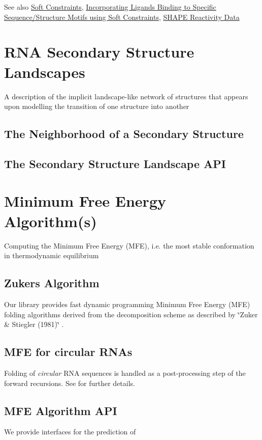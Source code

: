 \begin{DoxySeeAlso}{See also}
\hyperlink{group__soft__constraints}{Soft Constraints}, \hyperlink{group__constraints__ligand}{Incorporating Ligands Binding to Specific Sequence/\+Structure Motifs using Soft Constraints}, \hyperlink{group__SHAPE__reactivities}{S\+H\+A\+PE Reactivity Data}
\end{DoxySeeAlso}
 \hypertarget{secondary_structure_landscape}{}\section{R\+NA Secondary Structure Landscapes}\label{secondary_structure_landscape}
A description of the implicit landscape-\/like network of structures that appears upon modelling the transition of one structure into another\hypertarget{secondary_structure_landscape_landscape_neighborhood}{}\subsection{The Neighborhood of a Secondary Structure}\label{secondary_structure_landscape_landscape_neighborhood}
\hypertarget{secondary_structure_landscape_landscape_api}{}\subsection{The Secondary Structure Landscape A\+PI}\label{secondary_structure_landscape_landscape_api}
 \hypertarget{mfe_algorithm}{}\section{Minimum Free Energy Algorithm(s)}\label{mfe_algorithm}
Computing the Minimum Free Energy (M\+FE), i.\+e. the most stable conformation in thermodynamic equilibrium\hypertarget{mfe_algorithm_zuker_algorithm}{}\subsection{Zuker\textquotesingle{}s Algorithm}\label{mfe_algorithm_zuker_algorithm}
Our library provides fast dynamic programming Minimum Free Energy (M\+FE) folding algorithms derived from the decomposition scheme as described by \char`\"{}\+Zuker \& Stiegler (1981)\char`\"{} \cite{zuker:1981}.\hypertarget{mfe_algorithm_circular_folding}{}\subsection{M\+F\+E for circular R\+N\+As}\label{mfe_algorithm_circular_folding}
Folding of {\itshape circular} R\+NA sequences is handled as a post-\/processing step of the forward recursions. See \cite{hofacker:2006} for further details.\hypertarget{mfe_algorithm_mfe_algorithm_api}{}\subsection{M\+F\+E Algorithm A\+PI}\label{mfe_algorithm_mfe_algorithm_api}
We provide interfaces for the prediction of


